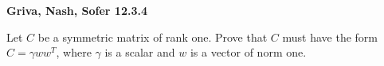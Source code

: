 \textbf{Griva, Nash, Sofer 12.3.4}

Let $C$ be a symmetric matrix of rank one. Prove that $C$ must have the form $C = \gamma w w^T$, where $\gamma$ is a 
scalar and $w$ is a vector of norm one.

\begin{solution}
    \ \\
    \vfill
\end{solution}
